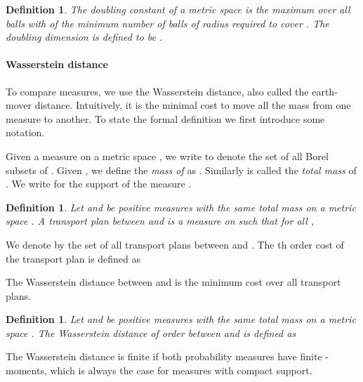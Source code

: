 \documentclass[a4paper]{article}
\newtheorem{definition}[theorem]{Definition}
\begin{document}
\begin{definition}\label{def:doubling_dimension}
  The \emph{doubling constant}  of a metric space  is the maximum over all balls  with  of the minimum number of balls of radius  required to cover .
  The \emph{doubling dimension} is defined to be .
\end{definition}

\paragraph{Wasserstein distance\\}
To compare measures, we use the Wasserstein distance, also called the earth-mover distance.
Intuitively, it is the minimal cost to move all the mass from one measure to another.
To state the formal definition we first introduce some notation.

Given a measure  on a metric space , we write  to denote the set of all Borel subsets of .
Given , we define the \emph{mass of } as .
Similarly  is called the \emph{total mass} of .
We write  for the support of the measure .


\begin{definition}
Let  and  be positive measures with the same total mass on a metric space .
A \emph{transport plan} between  and  is a measure  on  such that for all ,

\end{definition}

We denote by  the set of all transport plans between  and .
The th order cost of the transport plan  is defined as

The Wasserstein distance between  and  is the minimum cost over all transport plans.

\begin{definition}
Let  and  be positive measures with the same total mass on a metric space . 
The \emph{Wasserstein distance} of order  between  and  is defined as

\end{definition}

The Wasserstein distance is finite if both probability measures have finite -moments, which is always the case for measures with compact support.
\end{document}
